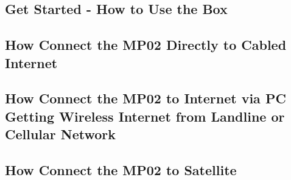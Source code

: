 \subsection{Get Started - How to Use the Box}



\subsection{How Connect the MP02 Directly to Cabled Internet}
\label{subsec:cabledInternet}


\subsection{How Connect the MP02 to Internet via PC Getting Wireless Internet from Landline or Cellular Network}
\label{subsec:internetviaPC}

 


\subsection{How Connect the MP02 to Satellite}

